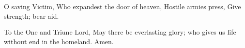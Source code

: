 \begin{otherlanguage}{english} O saving Victim,
Who expandest the door of heaven,
Hostile armies press,
Give strength; bear aid.%

To the One and Triune Lord,
May there be everlasting glory;
who gives us life without end in the homeland. Amen.\end{otherlanguage}
